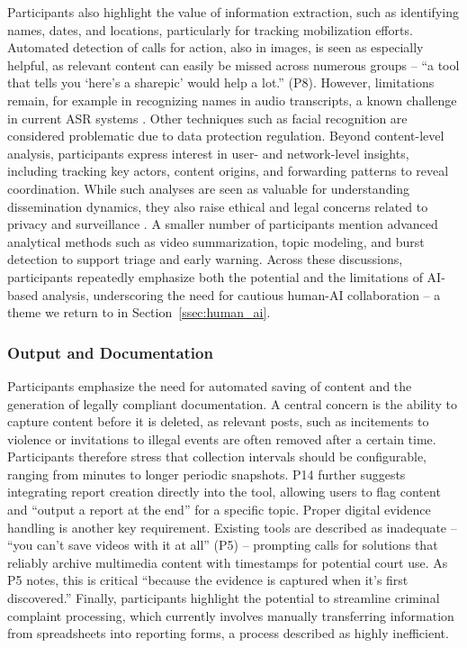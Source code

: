 \documentclass[acmsmall]{acmart}
\begin{document}
Participants also highlight the value of information extraction, such as identifying names, dates, and locations, particularly for tracking mobilization efforts. Automated detection of calls for action, also in images, is seen as especially helpful, as relevant content can easily be missed across numerous groups -- ``a tool that tells you `here's a sharepic' would help a lot.'' (P8). However, limitations remain, for example in recognizing names in audio transcripts, a known challenge in current ASR systems \cite{ayache2024whispernerunifiedopennamed}. Other techniques such as facial recognition are considered problematic due to data protection regulation.
Beyond content-level analysis, participants express interest in user- and network-level insights, including tracking key actors, content origins, and forwarding patterns to reveal coordination. While such analyses are seen as valuable for understanding dissemination dynamics, they also raise ethical and legal concerns related to privacy and surveillance \cite{conway_online_2021,massanari_rethinking_2018}.
A smaller number of participants mention advanced analytical methods such as video summarization, topic modeling, and burst detection to support triage and early warning. Across these discussions, participants repeatedly emphasize both the potential and the limitations of AI-based analysis, underscoring the need for cautious human-AI collaboration -- a theme we return to in Section~\ref{ssec:human_ai}.

\subsubsection{Output and Documentation} 
\label{sssec:output}
Participants emphasize the need for automated saving of content and the generation of legally compliant documentation.
A central concern is the ability to capture content before it is deleted, as relevant posts, such as incitements to violence or invitations to illegal events are often removed after a certain time. Participants therefore stress that collection intervals should be configurable, ranging from minutes to longer periodic snapshots. P14 further suggests integrating report creation directly into the tool, allowing users to flag content and ``output a report at the end'' for a specific topic.
Proper digital evidence handling is another key requirement. Existing tools are described as inadequate -- ``you can't save videos with it at all'' (P5) -- prompting calls for solutions that reliably archive multimedia content with timestamps for potential court use. As P5 notes, this is critical ``because the evidence is captured when it’s first discovered.''
Finally, participants highlight the potential to streamline criminal complaint processing, which currently involves manually transferring information from spreadsheets into reporting forms, a process described as highly inefficient.
\end{document}
